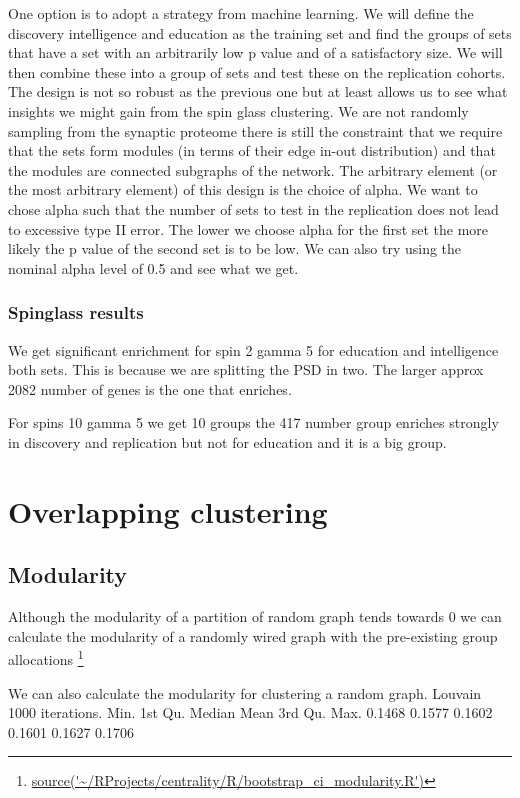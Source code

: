 One option is to adopt a strategy from machine learning. We will define the discovery intelligence and education as the training set and find the groups of sets that have a set with an arbitrarily low p value and of a satisfactory size. We will then combine these into a group of sets and test these on the replication cohorts. The design is not so robust as the previous one but at least allows us to see what insights we might gain from the spin glass clustering. We are not randomly sampling from the synaptic proteome there is still the constraint that we require that the sets form modules (in terms of their edge in-out distribution) and that the modules are connected subgraphs of the network. The arbitrary element (or the most arbitrary element) of this design is the choice of alpha. We want to chose alpha such that the number of sets to test in the replication does not lead to excessive type II error. The lower we choose alpha for the first set the more likely the p value of the second set is to be low. We can also try using the nominal alpha level of 0.5 and see what we get. 

\subsubsection{Spinglass results}
We get significant enrichment for spin 2 gamma 5 for education and intelligence both sets. This is because we are splitting the PSD in two. The larger approx 2082 number of genes is the one that enriches.

For spins 10 gamma 5 we get 10 groups the 417 number group enriches strongly in discovery and replication but not for education and it is a big group.


\section{Overlapping clustering}

\subsection{Modularity}

Although the modularity of a partition of random graph tends towards 0 we can calculate the modularity of a randomly wired graph with the pre-existing group allocations \footnote{\url{source('~/RProjects/centrality/R/bootstrap_ci_modularity.R')}}

We can also calculate the modularity for clustering a random graph. Louvain 1000 iterations.
  Min. 1st Qu.  Median    Mean 3rd Qu.    Max. 
 0.1468  0.1577  0.1602  0.1601  0.1627  0.1706 
 
